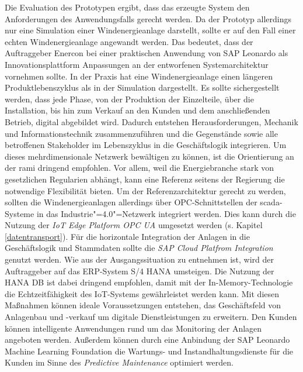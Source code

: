 Die Evaluation des Prototypen ergibt, dass das erzeugte System den Anforderungen des Anwendungsfalls gerecht werden. Da der Prototyp allerdings nur eine Simulation einer Windenergieanlage darstellt, sollte er auf den Fall einer echten Windenergieanlage angewandt werden. Das bedeutet, dass der Auftraggeber Enercon bei einer praktischen Anwendung von SAP Leonardo als Innovationsplattform Anpassungen an der entworfenen Systemarchitektur vornehmen sollte. In der Praxis hat eine Windenergieanlage einen längeren Produktlebenszyklus als in der Simulation dargestellt. Es sollte sichergestellt werden, dass jede Phase, von der Produktion der Einzelteile, über die Installation, bis hin zum Verkauf an den Kunden und dem anschließenden Betrieb, digital abgebildet wird. Dadurch entstehen Herausforderungen, Mechanik und Informationstechnik zusammenzuführen und die Gegenstände sowie alle betroffenen Stakeholder im Lebenszyklus in die Geschäftslogik integrieren. Um dieses mehrdimensionale Netzwerk bewältigen zu können, ist die Orientierung an der \ac{rami} dringend empfohlen. Vor allem, weil die Energiebranche stark von gesetzlichen Regularien abhängt, kann eine Referenz seitens der Regierung die notwendige Flexibilität bieten. Um der Referenzarchitektur gerecht zu werden, sollten die Windenergieanlagen allerdings über OPC-Schnittstellen der \ac{scada}-Systeme in das Industrie"=4.0"=Netzwerk integriert werden. Dies kann durch die Nutzung der \textit{IoT Edge Platform OPC UA} umgesetzt werden (s. Kapitel \ref{datentransport}). Für die horizontale Integration der Anlagen in die Geschäftslogik und Stammdaten sollte die \textit{SAP Cloud Platfrom Integration} genutzt werden. Wie aus der Ausgangssituation zu entnehmen ist, wird der Auftraggeber auf das ERP-System S/4 HANA umsteigen. Die Nutzung der HANA DB ist dabei dringend empfohlen, damit mit der In-Memory-Technologie die Echtzeitfähigkeit des IoT-Systems gewährleistet werden kann. Mit diesen Maßnahmen können ideale Voraussetzungen entstehen, das Geschäftsfeld von Anlagenbau und -verkauf um digitale Dienstleistungen zu erweitern. Den Kunden können intelligente Anwendungen rund um das Monitoring der Anlagen angeboten werden. Außerdem können durch eine Anbindung der SAP Leonardo Machine Learning Foundation die Wartungs- und Instandhaltungsdienste für die Kunden im Sinne des \textit{Predictive Maintenance} optimiert werden. 
 

\newpage
